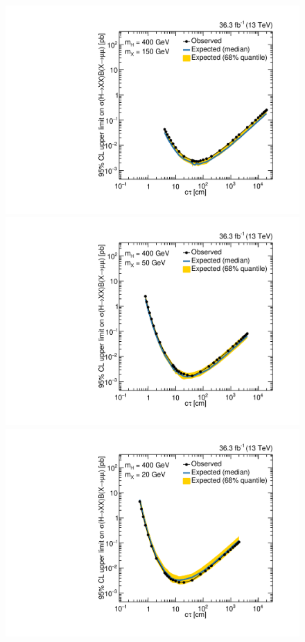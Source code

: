 \begin{figure}[htbp]
  \centering
  \includegraphics[width=\DSquareWidth]{figures/displaced/Limits_2Mu_400_150_HybridNew.pdf}
  \hspace*{-2em}
  \includegraphics[width=\DSquareWidth]{figures/displaced/Limits_2Mu_400_50_HybridNew.pdf} \\
  \includegraphics[width=\DSquareWidth]{figures/displaced/Limits_2Mu_400_20_HybridNew.pdf}

\end{figure}

